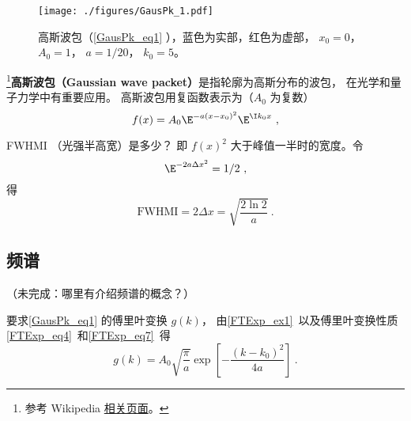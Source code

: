 
\begin{issues}
\issueDraft
\end{issues}


\begin{figure}[ht]
\centering
\texttt{[image: ./figures/GausPk\_1.pdf]}
\caption{高斯波包（\autoref{GausPk_eq1} ），蓝色为实部，红色为虚部， $x_0 = 0$， $A_0 = 1$， $a = 1/20$， $k_0 = 5$。} \label{GausPk_fig1}
\end{figure}

\footnote{参考 Wikipedia \href{https://en.wikipedia.org/wiki/Wave_packet}{相关页面}。}\textbf{高斯波包（Gaussian wave packet）}是指轮廓为高斯分布的波包， 在光学和量子力学中有重要应用。 高斯波包用复函数表示为（$A_0$ 为复数）
\begin{equation}\label{GausPk_eq1}
f(x) = A_0 \E^{-a(x-x_0)^2}\E^{\I k_0 x}~,
\end{equation}

FWHMI （光强半高宽）是多少？ 即 $f(x)^2$ 大于峰值一半时的宽度。令
\begin{equation}
\E^{-2a\Delta x^2} = 1/2~,
\end{equation}
得
\begin{equation}
\mathrm{FWHMI} = 2\Delta x = \sqrt{\frac{2\ln 2}{a}}~.
\end{equation}

\subsection{频谱}
（未完成：哪里有介绍频谱的概念？）

要求\autoref{GausPk_eq1} 的傅里叶变换 $g(k)$， 由\autoref{FTExp_ex1}~以及傅里叶变换性质\autoref{FTExp_eq4}~和\autoref{FTExp_eq7}~得
\begin{equation}
g(k) = A_0\sqrt{\frac{\pi}{a}} \exp[-\frac{(k-k_0)^2}{4a}]~.
\end{equation}
